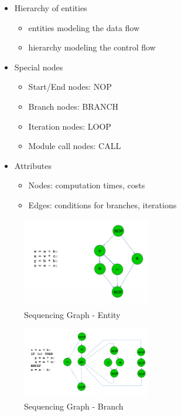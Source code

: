 \begin{itemize}
	\item Hierarchy of entities
\begin{itemize}
	\item entities modeling the data flow
	\item hierarchy modeling the control flow
\end{itemize}
\item Special nodes
\begin{itemize}
	\item Start/End nodes: NOP
	\item Branch nodes: BRANCH
	\item Iteration nodes: LOOP
	\item Module call nodes: CALL
\end{itemize}
\item Attributes
\begin{itemize}
	\item Nodes: computation times, costs
	\item Edges: conditions for branches, iterations
\end{itemize}

\end{itemize}

\begin{figure}[h]
	\begin{center}
		\includegraphics[width=0.5\textwidth]{images/SG_entity.png}
		\caption{Sequencing Graph - Entity}
		\label{fig:SG_entity}
	\end{center}
\end{figure}

\begin{figure}[h]
	\begin{center}
		\includegraphics[width=0.5\textwidth]{images/SG_branch.png}
		\caption{Sequencing Graph - Branch}
		\label{fig:SG_branch}
	\end{center}
\end{figure}

